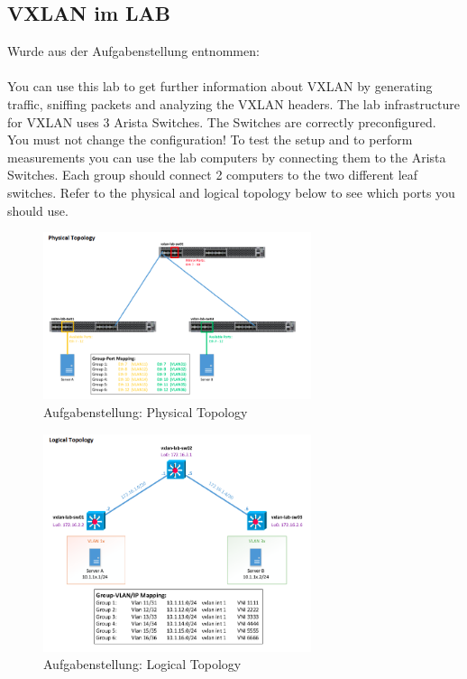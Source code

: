 \documentclass[a4,12pt]{scrartcl}
\begin{document}
\subsection{VXLAN im LAB}
Wurde aus der Aufgabenstellung entnommen: \\
\\
You can use this lab to get further information about VXLAN by generating traffic, sniffing packets and analyzing the VXLAN headers. The lab infrastructure for VXLAN uses 3 Arista Switches. The Switches are correctly preconfigured. You must not change the configuration! To test the setup and to perform measurements you can use the lab computers by connecting them to the Arista Switches. Each group should connect 2 computers to the two different leaf switches. Refer to the physical and logical topology below to see which ports you should use.

\begin{figure} [H]
	\begin{center}
	\includegraphics[width=0.70\textwidth]{./pictures/vxlan_physical.png}
	\caption{Aufgabenstellung: Physical Topology}
	\label{x}
	\end{center}
\end{figure}

\begin{figure} [H]
	\begin{center}
	\includegraphics[width=0.70\textwidth]{./pictures/vxlan_logical.png}
	\caption{Aufgabenstellung: Logical Topology}
	\label{x}
	\end{center}
\end{figure}
\end{document}
